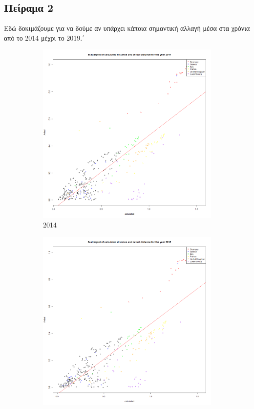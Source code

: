 \documentclass[a4paper,twoside,10pt]{article}
\begin{document}
	\subsection{Πείραμα 2}
	Εδώ δοκιμάζουμε για να δούμε αν υπάρχει κάποια σημαντική αλλαγή μέσα στα χρόνια από το 2014 μέχρι το 2019.΄
	\begin{figure}[H]
		\centering
		\begin{subfigure}[b]{0.3\textwidth}
			\centering
			\includegraphics[width=\textwidth]{images/scatterplot_with_regression_line_ 2014 .png}
			\caption{2014}
		\end{subfigure}
		\hfill
		\begin{subfigure}[b]{0.3\textwidth}
			\centering
			\includegraphics[width=\textwidth]{images/scatterplot_with_regression_line_ 2015 .png}

\end{subfigure}
\end{figure}
\end{document}
